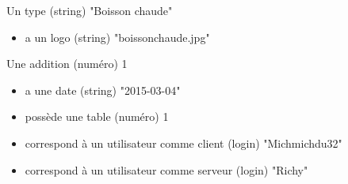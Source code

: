 \documentclass[10pt, a4, oneside, headings=normal]{scrartcl}
\begin{document}
Un type (string) "Boisson chaude"
\begin{itemize}
\item a un logo (string) "boissonchaude.jpg"
\end{itemize}

Une addition (numéro) 1
\begin{itemize}
\item a une date (string) "2015-03-04"
\item possède une table (numéro) 1
\item correspond à un utilisateur comme client (login) "Michmichdu32"
\item correspond à un utilisateur comme serveur (login) "Richy"
\end{itemize}
\end{document}
